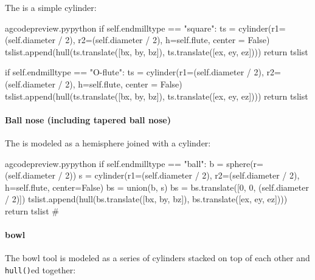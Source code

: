 \documentclass{ltxdoc}
\begin{document}
The  is a simple cylinder:

\lstset{firstnumber=\thegcpy}
\begin{writecode}{a}{gcodepreview.py}{python}
        if self.endmilltype == "square":
            ts = cylinder(r1=(self.diameter / 2), r2=(self.diameter / 2), h=self.flute, center = False)
            tslist.append(hull(ts.translate([bx, by, bz]), ts.translate([ex, ey, ez])))
            return tslist

        if self.endmilltype == "O-flute":
            ts = cylinder(r1=(self.diameter / 2), r2=(self.diameter / 2), h=self.flute, center = False)
            tslist.append(hull(ts.translate([bx, by, bz]), ts.translate([ex, ey, ez])))
            return tslist

\end{writecode}
\addtocounter{gcpy}{23}

\paragraph{Ball nose (including tapered ball nose)}

The  is modeled as a hemisphere joined with a cylinder:

\lstset{firstnumber=\thegcpy}
\begin{writecode}{a}{gcodepreview.py}{python}
        if self.endmilltype == "ball":
            b = sphere(r=(self.diameter / 2))
            s = cylinder(r1=(self.diameter / 2), r2=(self.diameter / 2), h=self.flute, center=False)
            bs = union(b, s)
            bs = bs.translate([0, 0, (self.diameter / 2)])
            tslist.append(hull(bs.translate([bx, by, bz]), bs.translate([ex, ey, ez])))
            return tslist
#
\end{writecode}
\addtocounter{gcpy}{23}

\paragraph{bowl} 

The bowl tool is modeled as a series of cylinders stacked on top of each other and \verb|hull()|ed together:
\end{document}

